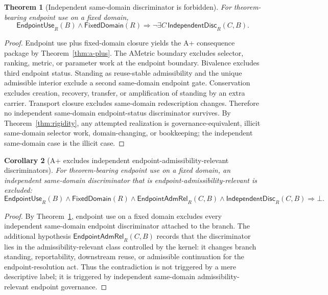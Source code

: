 \documentclass[11pt]{article}
\newtheorem{theorem}{Theorem}[section]
\newtheorem{corollary}[theorem]{Corollary}
\theoremstyle{definition}
\theoremstyle{remark}
\newcommand{\EndpointUse}{\mathsf{EndpointUse}}
\newcommand{\IndDisc}{\mathsf{IndependentDisc}}
\newcommand{\FixedDom}{\mathsf{FixedDomain}}
\newcommand{\EndpointAdmRel}{\mathsf{EndpointAdmRel}}
\begin{document}
\begin{theorem}[Independent same-domain discriminator is forbidden]\label{thm:independent-discriminator-forbidden}
For theorem-bearing endpoint use on a fixed domain,
\[
  \EndpointUse_R(B)\wedge\FixedDom(R)\Rightarrow
  \neg\exists C\,\IndDisc_R(C,B).
\]
\end{theorem}

\begin{proof}
Endpoint use plus fixed-domain closure yields the A+ consequence package by Theorem~\ref{thm:a-plus}. The AMetric boundary excludes selector, ranking, metric, or parameter work at the endpoint boundary. Bivalence excludes third endpoint status. Standing as reuse-stable admissibility and the unique admissible interior exclude a second same-domain endpoint gate. Conservation excludes creation, recovery, transfer, or amplification of standing by an extra carrier. Transport closure excludes same-domain redescription changes. Therefore no independent same-domain endpoint-status discriminator survives. By Theorem~\ref{thm:rigidity}, any attempted realization is governance-equivalent, illicit same-domain selector work, domain-changing, or bookkeeping; the independent same-domain case is the illicit case.
\end{proof}


\begin{corollary}[A+ excludes independent endpoint-admissibility-relevant discriminators]\label{cor:aplus-excludes-independent-endpoint-admrel}
For theorem-bearing endpoint use on a fixed domain, an independent same-domain discriminator that is endpoint-admissibility-relevant is excluded:
\[
  \EndpointUse_R(B)\wedge\FixedDom(R)\wedge
  \EndpointAdmRel_R(C,B)\wedge\IndDisc_R(C,B)
  \Rightarrow \bot.
\]
\end{corollary}

\begin{proof}
By Theorem~\ref{thm:independent-discriminator-forbidden}, endpoint use on a fixed domain excludes every independent same-domain endpoint discriminator attached to the branch. The additional hypothesis \(\EndpointAdmRel_R(C,B)\) records that the discriminator lies in the admissibility-relevant class controlled by the kernel: it changes branch standing, reportability, downstream reuse, or admissible continuation for the endpoint-resolution act. Thus the contradiction is not triggered by a mere descriptive label; it is triggered by independent same-domain admissibility-relevant endpoint governance.
\end{proof}
\end{document}
